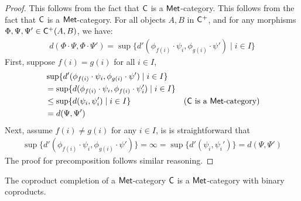 \begin{proof}
  This follows from the fact that $\mathsf{C}$ is a $\mathsf{Met}$-category. This follows from the fact that $\mathsf{C}$ is a $\mathsf{Met}$-category. For all objects $A, B$ in $\mathsf{C}^+$, and for any morphisms $\Phi, \Psi, \Psi' \in \mathsf{C}^+(A, B)$, we have:
  \begin{align*}
    d(\Phi \cdot \Psi, \Phi \cdot \Psi') = \sup \{d'(\phi_{f(i)} \cdot \psi_i, \phi_{g(i)} \cdot \psi')  \;\vert\; i \in I \}
  \end{align*}
  First, suppose $f(i)=g(i)$ for all $i \in I$,
  \begin{align*}
   & \sup \{d'(\phi_{f(i)} \cdot \psi_i, \phi_{g(i)} \cdot \psi')  \;\vert\; i \in I \} \\
   &= \sup \{d(\phi_{f(i)} \cdot \psi_i,\phi_{f(i)} \cdot \psi_i' ) \;\vert\; i \in I\}\\
      &  \leq \sup \{d( \psi_i, \psi_i' ) \;\vert\; i \in I\} & (\mathsf{C} \text{ is a $\mathsf{Met}$-category}) \\
      & = d(\Psi, \Psi')
  \end{align*}
  Next, assume $f(i)\neq g(i)$ for any $i \in I$, is is straightforward that 
  \begin{align*}
   \sup \{d'(\phi_{f(i)} \cdot \psi_i, \phi_{g(i)} \cdot \psi') \} = \infty = \sup \{d'(\psi_i, \psi_i') \} = d(\Psi, \Psi')
  \end{align*}
  The proof for precomposition follows similar reasoning.
\end{proof}


  \begin{proposition}
  The coproduct completion of a $\mathsf{Met}$-category $\mathsf{C}$ is a  $\mathsf{Met}$-category with binary coproducts.
\end{proposition}

